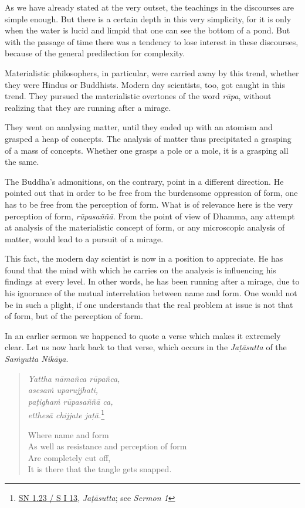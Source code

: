 As we have already stated at the very outset, the teachings in the discourses are simple enough. But there is a certain depth in this very simplicity, for it is only when the water is lucid and limpid that one can see the bottom of a pond. But with the passage of time there was a tendency to lose interest in these discourses, because of the general predilection for complexity.

Materialistic philosophers, in particular, were carried away by this trend, whether they were Hindus or Buddhists. Modern day scientists, too, got caught in this trend. They pursued the materialistic overtones of the word \emph{rūpa}, without realizing that they are running after a mirage.

They went on analysing matter, until they ended up with an atomism and grasped a heap of concepts. The analysis of matter thus precipitated a grasping of a mass of concepts. Whether one grasps a pole or a mole, it is a grasping all the same.

The Buddha's admonitions, on the contrary, point in a different direction. He pointed out that in order to be free from the burdensome oppression of form, one has to be free from the perception of form. What is of relevance here is the very perception of form, \emph{rūpasaññā}. From the point of view of Dhamma, any attempt at analysis of the materialistic concept of form, or any microscopic analysis of matter, would lead to a pursuit of a mirage.

This fact, the modern day scientist is now in a position to appreciate. He has found that the mind with which he carries on the analysis is influencing his findings at every level. In other words, he has been running after a mirage, due to his ignorance of the mutual interrelation between name and form. One would not be in such a plight, if one understands that the real problem at issue is not that of form, but of the perception of form.

In an earlier sermon we happened to quote a verse which makes it extremely clear. Let us now hark back to that verse, which occurs in the \emph{Jaṭāsutta} of the \emph{Saṁyutta Nikāya}.

\begin{quote}
\emph{Yattha nāmañca rūpañca,}\\
\emph{asesaṁ uparujjhati,}\\
\emph{paṭighaṁ rūpasaññā ca,}\\
\emph{etthesā chijjate jaṭā.}\footnote{\href{https://suttacentral.net/sn1.23/pli/ms}{SN 1.23 / S I 13}, \emph{Jaṭāsutta}; see \emph{Sermon 1}}

Where name and form\\
As well as resistance and perception of form\\
Are completely cut off,\\
It is there that the tangle gets snapped.
\end{quote}


